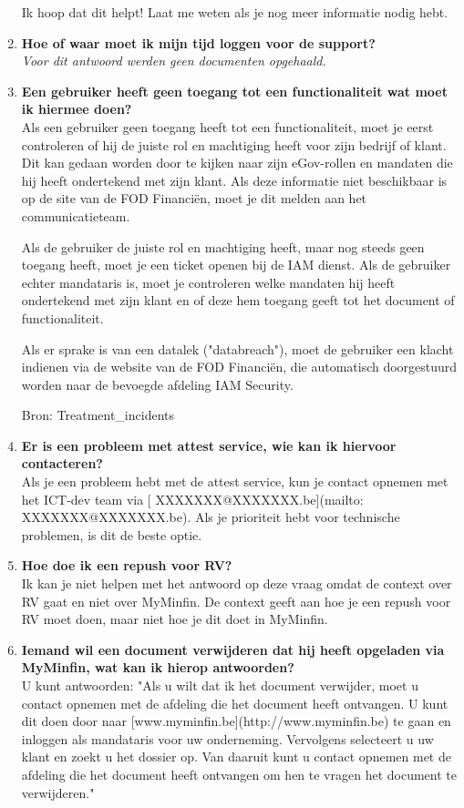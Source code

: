 \begin{enumerate}
    Ik hoop dat dit helpt! Laat me weten als je nog meer informatie nodig hebt.
    
    
    
    \item \textbf{Hoe of waar moet ik mijn tijd loggen voor de support?} \\
    \textit{Voor dit antwoord werden geen documenten opgehaald.}
    
    \item \textbf{Een gebruiker heeft geen toegang tot een functionaliteit wat moet ik hiermee doen?} \\
    Als een gebruiker geen toegang heeft tot een functionaliteit, moet je eerst controleren of hij de juiste rol en machtiging heeft voor zijn bedrijf of klant. Dit kan gedaan worden door te kijken naar zijn eGov-rollen en mandaten die hij heeft ondertekend met zijn klant. Als deze informatie niet beschikbaar is op de site van de FOD Financiën, moet je dit melden aan het communicatieteam.
    
    Als de gebruiker de juiste rol en machtiging heeft, maar nog steeds geen toegang heeft, moet je een ticket openen bij de IAM dienst. Als de gebruiker echter mandataris is, moet je controleren welke mandaten hij heeft ondertekend met zijn klant en of deze hem toegang geeft tot het document of functionaliteit.
    
    Als er sprake is van een datalek ("databreach"), moet de gebruiker een klacht indienen via de website van de FOD Financiën, die automatisch doorgestuurd worden naar de bevoegde afdeling IAM Security.
    
    Bron: Treatment\_incidents 
    
    \item \textbf{Er is een probleem met attest service, wie kan ik hiervoor contacteren?} \\
    Als je een probleem hebt met de attest service, kun je contact opnemen met het ICT-dev team via [ XXXXXXX@XXXXXXX.be](mailto: XXXXXXX@XXXXXXX.be). Als je prioriteit hebt voor technische problemen, is dit de beste optie.
    
    \item \textbf{Hoe doe ik een repush voor RV?} \\
    Ik kan je niet helpen met het antwoord op deze vraag omdat de context over RV gaat en niet over MyMinfin. De context geeft aan hoe je een repush voor RV moet doen, maar niet hoe je dit doet in MyMinfin.
    
    
    \item \textbf{Iemand wil een document verwijderen dat hij heeft opgeladen via MyMinfin, wat kan ik hierop antwoorden?} \\
    U kunt antwoorden: "Als u wilt dat ik het document verwijder, moet u contact opnemen met de afdeling die het document heeft ontvangen. U kunt dit doen door naar [www.myminfin.be](http://www.myminfin.be) te gaan en inloggen als mandataris voor uw onderneming. Vervolgens selecteert u uw klant en zoekt u het dossier op. Van daaruit kunt u contact opnemen met de afdeling die het document heeft ontvangen om hen te vragen het document te verwijderen."
    

\end{enumerate}
